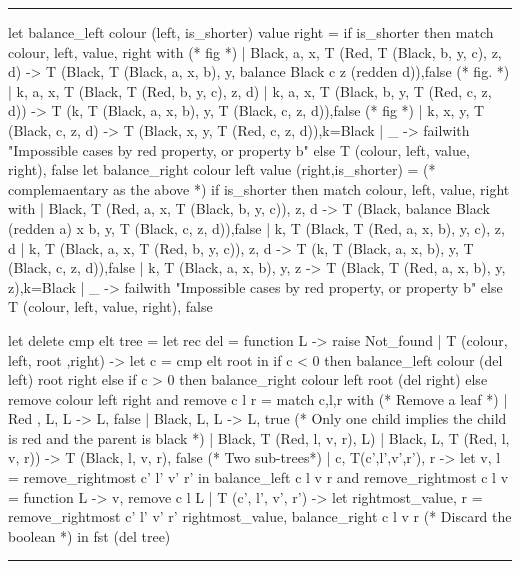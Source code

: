 \documentclass[10pt,a4paper]{article}
\newenvironment{codeblock}%
{\center \minipage{\textwidth} \vspace{6pt} \hrule \vspace{6pt} \minted{ocaml}}%
{\endminted \hrule \vspace{6pt} \endminipage \endcenter}
\begin{document}
\begin{codeblock}
let balance_left colour (left, is_shorter) value right =
    if is_shorter then
        match colour, left, value, right with
        (* fig *)
        | Black, a, x, T (Red, T (Black, b, y, c), z, d)
          -> T (Black, T (Black, a, x, b), y, balance Black c z (redden d)),false
        (* fig.  *)
        | k, a, x, T (Black, T (Red, b, y, c), z, d)
        | k, a, x, T (Black, b, y, T (Red, c, z, d))
          -> T (k, T (Black, a, x, b), y, T (Black, c, z, d)),false
        (* fig *)
        | k, x, y, T (Black, c, z, d)
          -> T (Black, x, y, T (Red, c, z, d)),k=Black
        | _ -> failwith "Impossible cases by red property, or property b"
    else
        T (colour, left, value, right), false
let balance_right colour left value (right,is_shorter) =
   (* complemaentary as the above *)
   if is_shorter then
       match colour, left, value, right with
        | Black, T (Red, a, x, T (Black, b, y, c)), z, d
          -> T (Black, balance Black (redden a) x b, y, T (Black, c, z, d)),false
        | k, T (Black, T (Red, a, x, b), y, c), z, d
        | k, T (Black, a, x, T (Red, b, y, c)), z, d
          -> T (k, T (Black, a, x, b), y, T (Black, c, z, d)),false
        | k, T (Black, a, x, b), y, z
          -> T (Black, T (Red, a, x, b), y, z),k=Black
        | _ -> failwith "Impossible cases by red property, or property b"
    else
        T (colour, left, value, right), false

let delete cmp elt tree =
    let rec del = function
        L -> raise Not_found
      | T (colour, left, root ,right) ->
        let c = cmp elt root in
        if c < 0 then balance_left colour (del left) root right
        else if c > 0 then balance_right colour left root (del right)
        else remove colour left right
  and remove c l r = match c,l,r with
    (* Remove a leaf *)
    | Red  , L, L -> L, false
    | Black, L, L -> L, true
    (* Only one child implies the child is red and the parent is black *)
    | Black, T (Red, l, v, r), L)
    | Black, L, T (Red, l, v, r)) -> T (Black, l, v, r), false
    (* Two sub-trees*)
    | c, T(c',l',v',r'), r ->
      let v, l = remove_rightmost c' l' v' r' in
           balance_left c l v r
  and remove_rightmost c l v = function
      L -> v, remove c l L
    | T (c', l', v', r') ->
      let rightmost_value, r = remove_rightmost c' l' v' r'
      rightmost_value, balance_right c l v r
  (* Discard the boolean *)
  in fst (del tree)
\end{codeblock}
\end{document}
